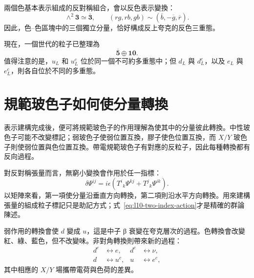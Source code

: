 \begin{classroomqa}
\end{classroomqa}

兩個色基本表示組成的反對稱組合，會以反色表示變換：
\begin{equation}
\wedge^2\mathbf3\simeq\overline{\mathbf3},
\qquad
(rg,rb,gb)\sim(\overline b,-\overline g,\overline r).
\label{eq:l10-anticolor}
\end{equation}
因此，色--色區塊中的三個獨立分量，恰好構成反上夸克的反色三重態。

現在，一個世代的粒子已整理為
\begin{equation}
\overline{\mathbf5}\oplus\mathbf{10}.
\label{eq:l10-family}
\end{equation}
值得注意的是，\(u_L\) 和 \(u^c_L\) 位於同一個不可約多重態中；但 \(d_L\) 與 \(d^c_L\)，以及 \(e_L\) 與 \(e^c_L\)，則各自位於不同的多重態。

\begin{classroomqa}
\end{classroomqa}

\section{規範玻色子如何使分量轉換}

表示建構完成後，便可將規範玻色子的作用理解為使其中的分量彼此轉換。中性玻色子可能不改變標記；弱玻色子使弱位置互換，膠子使色位置互換，而 \(X/Y\) 玻色子則使弱位置與色位置互換。帶電規範玻色子有對應的反粒子，因此每種轉換都有反向過程。

對反對稱張量而言，無窮小變換會作用於任一指標：
\begin{equation}
\delta\Psi^{ij}
=
i\epsilon
\left(
T^i{}_k\Psi^{kj}
+
T^j{}_k\Psi^{ik}
\right).
\label{eq:l10-two-index-action}
\end{equation}
以矩陣來看，第一項使分量沿垂直方向轉換，第二項則沿水平方向轉換。用來建構張量的組成粒子標記只是助記方式；式~\eqref{eq:l10-two-index-action}才是精確的群論陳述。

弱作用的轉換會使 \(d\) 變成 \(u\)，這是中子 {\proseunicodefont β} 衰變在夸克層次的過程。色轉換會改變紅、綠、藍色，但不改變味。非對角轉換則帶來新的過程：
\begin{equation}
\begin{aligned}
d^c&\longleftrightarrow e,
& d^c&\longleftrightarrow\nu,\\
d&\longleftrightarrow u^c,
& u&\longleftrightarrow e^c,
\end{aligned}
\label{eq:l10-leptoquark-shifts}
\end{equation}
其中相應的 \(X/Y\) 場攜帶電荷與色荷的差異。

